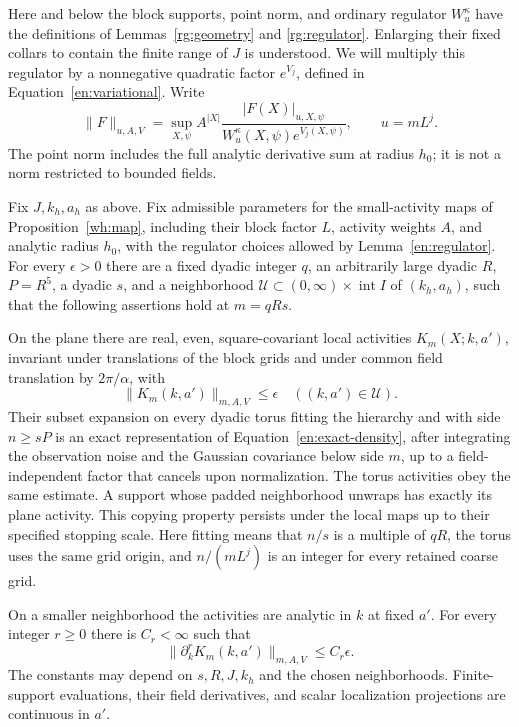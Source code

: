 Here and below the block supports, point norm, and ordinary regulator
$W_u^\kappa$ have the definitions of Lemmas~\ref{rg:geometry}
and \ref{rg:regulator}.  Enlarging their fixed collars to contain the
finite range of $J$ is understood.  We will multiply this regulator by
a nonnegative quadratic factor $e^{V_j}$, defined in
Equation~\eqref{en:variational}.  Write
\begin{equation}\label{en:norm}
 \|F\|_{u,A,V}=\sup_{X,\psi}
 A^{|X|}\frac{|F(X)|_{u,X,\psi}}
 {W_u^\kappa(X,\psi)e^{V_j(X,\psi)}},\qquad u=mL^j.
\end{equation}
The point norm includes the full analytic derivative sum at radius
$h_0$; it is not a norm restricted to bounded fields.

\begin{theorem}\label{en:entry}
Fix $J,k_h,a_h$ as above.  Fix admissible parameters for the small-activity
maps of Proposition~\ref{wh:map}, including their block factor $L$, activity
weights $A$, and analytic radius $h_0$, with the regulator choices allowed
by Lemma~\ref{en:regulator}.  For every $\epsilon>0$ there are a fixed
dyadic integer $q$, an arbitrarily large dyadic $R$, $P=R^5$, a dyadic
$s$, and a neighborhood
$\mathcal U\subset(0,\infty)\times\operatorname{int}I$ of $(k_h,a_h)$,
such that the following assertions hold at $m=qRs$.

On the plane there are real, even, square-covariant local activities
$K_m(X;k,a')$, invariant under translations of the block grids and
under common field translation by $2\pi/\alpha$, with
\begin{equation}\label{en:small}
                 \|K_m(k,a')\|_{m,A,V}\leq\epsilon
                 \quad ((k,a')\in\mathcal U).
\end{equation}
Their subset expansion on every dyadic torus fitting the hierarchy and
with side $n\geq sP$ is an exact representation of
Equation~\eqref{en:exact-density}, after integrating the observation
noise and the Gaussian covariance below side $m$, up to a
field-independent factor that cancels upon normalization.  The torus
activities obey the same estimate.  A support whose padded neighborhood
unwraps has exactly its plane activity.  This copying property persists
under the local maps up to their specified stopping scale.
Here fitting means that $n/s$ is a multiple of $qR$, the torus uses
the same grid origin, and $n/(mL^j)$ is an integer for every retained
coarse grid.

On a smaller neighborhood the activities are analytic in $k$ at fixed
$a'$.  For every integer $r\geq0$ there is $C_r<\infty$ such that
\begin{equation}\label{en:derivatives}
 \|\partial_k^rK_m(k,a')\|_{m,A,V}\leq C_r\epsilon.
\end{equation}
The constants may depend on $s,R,J,k_h$ and the chosen neighborhoods.
Finite-support evaluations, their field derivatives, and scalar
localization projections are continuous in $a'$.


\end{theorem}
